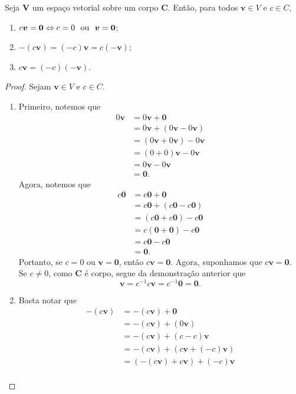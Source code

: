 \begin{prop}
	Seja $\bm V$ um espaço vetorial sobre um corpo $\bm C$. Então, para todos $\bm v \in V$ e $c \in C$,
	\begin{enumerate}
	\item $c\bm v = \bm 0 \Leftrightarrow c=0 \text{\ \ ou\ \ } \bm v = \bm 0$;
	\item $-(c\bm v) = (-c)\bm v = c(- \bm v)$;
	\item $c\bm v = (-c)(- \bm v)$.
	\end{enumerate}
\end{prop}
\begin{proof} Sejam $\bm v \in V$ e $c \in C$.
	\begin{enumerate}
	\item Primeiro, notemos que
		\begin{align*}
		0 \bm v &= 0 \bm v + \bm 0 \\
			&= 0 \bm v + (0 \bm v - 0 \bm v) \\
			&= (0 \bm v + 0 \bm v) - 0 \bm v \\
			&= (0+0) \bm v - 0 \bm v \\
			&= 0 \bm v - 0 \bm v \\
			&= \bm 0.
		  \end{align*}
Agora, notemos que
		\begin{align*}
		c \bm 0 &= c \bm 0 + \bm 0 \\
			&= c \bm 0 + (c \bm 0 - c \bm 0) \\
			&= (c \bm 0 + c \bm 0) - c \bm 0 \\
			&= c  (\bm 0 + \bm 0) - c \bm 0 \\
			&= c \bm 0 - c \bm 0 \\
			&= \bm 0.
		\end{align*}
Portanto, se $c=0$ ou $\bm v = \bm 0$, então $c\bm v = \bm 0$. Agora, suponhamos que $c\bm v =\bm 0$. Se $c \neq 0$, como $\bm C$ é corpo, segue da demonstração anterior que
		\begin{equation*}
		\bm v = c^{-1}c\bm v = c^{-1} \bm 0 = \bm 0.
		\end{equation*}
	\item Basta notar que
		\begin{align*}
		\bm -(c\bm{v}) &= \bm -(c\bm{v}) + \bm 0 \\
			&= \bm -(c\bm{v}) + (0 \bm v) \\
			&= \bm -(c\bm{v}) + (c-c) \bm v \\
			&= \bm -(c\bm{v}) + (c\bm v + (-c) \bm v) \\
			&= (\bm -(c\bm{v}) + c\bm v) + (-c) \bm v \\

\end{align*}
\end{enumerate}
\end{proof}
